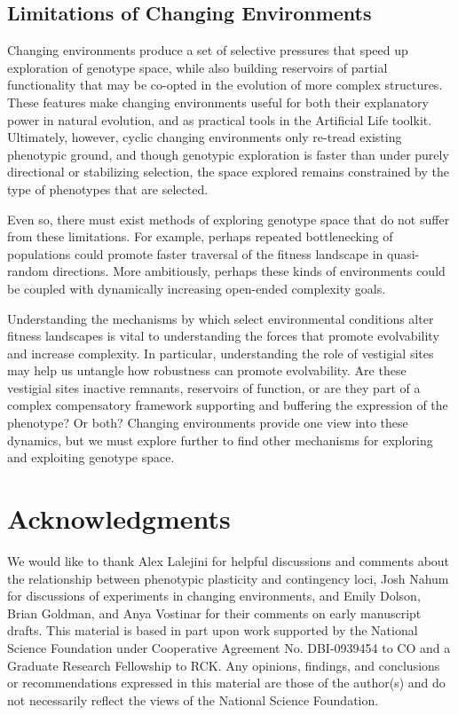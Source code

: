 \documentclass[10pt,letterpaper]{article}
\begin{document}
\subsection*{Limitations of Changing Environments}
Changing environments produce a set of selective pressures that speed up exploration of genotype space, while also building reservoirs of partial functionality that may be co-opted in the evolution of more complex structures. These features make changing environments useful for both their explanatory power in natural evolution, and as practical tools in the Artificial Life toolkit.
Ultimately, however, cyclic changing environments only re-tread existing phenotypic ground, and though genotypic exploration is faster than under purely directional or stabilizing selection, the space explored remains constrained by the type of phenotypes that are selected.

Even so, there must exist methods of exploring genotype space that do not suffer from these limitations.
For example, perhaps repeated bottlenecking of populations could promote faster traversal of the fitness landscape in quasi-random directions.
More ambitiously, perhaps these kinds of environments could be coupled with dynamically increasing open-ended complexity goals.

Understanding the mechanisms by which select environmental conditions alter fitness landscapes is vital to understanding the forces that promote evolvability and increase complexity. In particular, understanding the role of vestigial sites may help us untangle how robustness can promote evolvability. Are these vestigial sites inactive remnants, reservoirs of function, or are they part of a complex compensatory framework supporting and buffering the expression of the phenotype? Or both? Changing environments provide one view into these dynamics, but we must explore further to find other mechanisms for exploring and exploiting genotype space.

\section*{Acknowledgments}
We would like to thank Alex Lalejini for helpful discussions and comments about the relationship between phenotypic plasticity and contingency loci, Josh Nahum for discussions of experiments in changing environments, and Emily Dolson, Brian Goldman, and Anya Vostinar for their comments on early manuscript drafts.
This material is based in part upon work supported by the National Science Foundation under Cooperative Agreement No. DBI-0939454 to CO and a Graduate Research Fellowship to RCK. Any opinions, findings, and conclusions or recommendations expressed in this material are those of the author(s) and do not necessarily reflect the views of the National Science Foundation.

%

\end{document}
